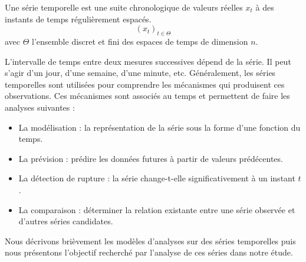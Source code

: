 \begin{definition}
Une s\'erie temporelle est une suite chronologique de valeurs r\'eelles $x_t$ \`a des instants de temps r\'eguli\`erement espac\'es. 
\begin{equation}
(x_t)_{ t \in \Theta}
\end{equation}
avec $\Theta $ l'ensemble discret et fini des espaces de temps de dimension $n$.
\end{definition}
L'intervalle de temps entre deux mesures successives d\'epend de la s\'erie. 
Il peut s'agir d'un jour, d'une semaine, d'une minute, etc.
G\'en\'eralement, les s\'eries temporelles sont utilis\'ees  pour comprendre les m\'ecanismes qui produisent ces observations. Ces m\'ecanismes sont associ\'es au temps et  permettent de faire les analyses suivantes :
\begin{itemize}
	\item La mod\'elisation : la repr\'esentation de la s\'erie sous la forme d'une fonction du temps.
	\item La pr\'evision : pr\'edire les donn\'ees futures \`a partir de valeurs pr\'ed\'ecentes.
	\item La d\'etection de rupture :  la s\'erie change-t-elle significativement \`a un instant $t$.
	\item La comparaison :  d\'eterminer la relation existante entre une s\'erie observ\'ee et d'autres s\'eries candidates.
\end{itemize}
Nous d\'ecrivons bri\`evement les mod\`eles d'analyses sur des s\'eries temporelles puis nous pr\'esentons l'objectif recherch\'e par l'analyse de ces s\'eries dans notre \'etude. 

